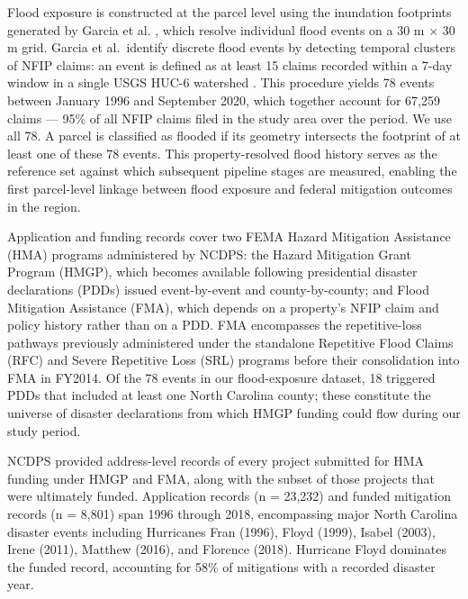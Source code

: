 \documentclass[
  authoryear,
  preprint]{elsarticle}
\begin{document}
Flood exposure is constructed at the parcel level using the inundation
footprints generated by Garcia et al.
\citeyearpar{garciaReconstructingRepetitiveFlood2025}, which resolve
individual flood events on a 30 m × 30 m grid. Garcia et al.~identify
discrete flood events by detecting temporal clusters of NFIP claims: an
event is defined as at least 15 claims recorded within a 7-day window in
a single USGS HUC-6 watershed
\citep{garciaReconstructingRepetitiveFlood2025}. This procedure yields
78 events between January 1996 and September 2020, which together
account for 67,259 claims --- 95\% of all NFIP claims filed in the study
area over the period. We use all 78. A parcel is classified as flooded
if its geometry intersects the footprint of at least one of these 78
events. This property-resolved flood history serves as the reference set
against which subsequent pipeline stages are measured, enabling the
first parcel-level linkage between flood exposure and federal mitigation
outcomes in the region.

Application and funding records cover two FEMA Hazard Mitigation
Assistance (HMA) programs administered by NCDPS: the Hazard Mitigation
Grant Program (HMGP), which becomes available following presidential
disaster declarations (PDDs) issued event-by-event and county-by-county;
and Flood Mitigation Assistance (FMA), which depends on a property's
NFIP claim and policy history rather than on a PDD. FMA encompasses the
repetitive-loss pathways previously administered under the standalone
Repetitive Flood Claims (RFC) and Severe Repetitive Loss (SRL) programs
before their consolidation into FMA in FY2014. Of the 78 events in our
flood-exposure dataset, 18 triggered PDDs that included at least one
North Carolina county; these constitute the universe of disaster
declarations from which HMGP funding could flow during our study period.

NCDPS provided address-level records of every project submitted for HMA
funding under HMGP and FMA, along with the subset of those projects that
were ultimately funded. Application records (n = 23,232) and funded
mitigation records (n = 8,801) span 1996 through 2018, encompassing
major North Carolina disaster events including Hurricanes Fran (1996),
Floyd (1999), Isabel (2003), Irene (2011), Matthew (2016), and Florence
(2018). Hurricane Floyd dominates the funded record, accounting for 58\%
of mitigations with a recorded disaster year.
\end{document}
